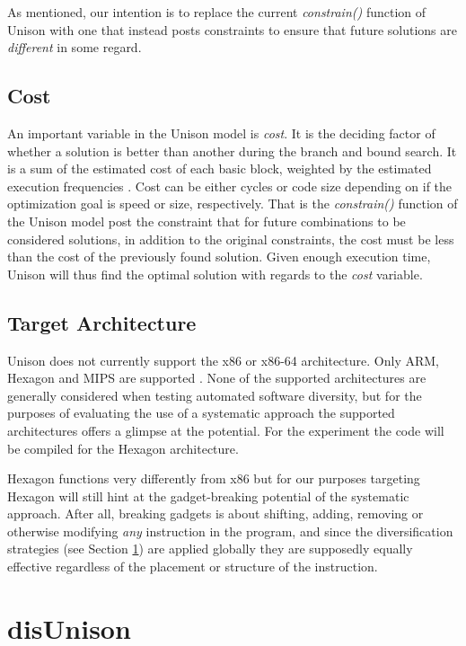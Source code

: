 As mentioned, our intention is to replace the current \textit{constrain()} function of
Unison with one that instead posts constraints to ensure that future solutions are
\textit{different} in some regard.

\subsection{Cost}
\label{sec:cost}

An important variable in the Unison model is \textit{cost}. It is the deciding factor
of whether a solution is better than another during the branch and bound search. It is a
sum of the estimated cost of each basic block, weighted by the estimated execution
frequencies \cite{unison-docs}. Cost can be either cycles or code size depending on if the
optimization goal is speed or size, respectively. That is the \textit{constrain()} function
of the Unison model post the constraint that for future combinations to be considered
solutions, in addition to the original constraints, the cost must be less than the cost of
the previously found solution. Given enough execution time, Unison will thus find the
optimal solution with regards to the \textit{cost} variable.

\subsection{Target Architecture}
\label{sec:arch}

Unison does not currently support the x86 or x86-64 architecture. Only ARM, Hexagon and MIPS
are supported \cite{unison-src}. None of the supported architectures are generally considered
when testing automated software diversity, but for the purposes of evaluating the use of
a systematic approach the supported architectures offers a glimpse at the potential. For
the experiment the code will be compiled for the Hexagon architecture.

Hexagon functions very differently from x86 but for our purposes targeting Hexagon will
still hint at the gadget-breaking potential of the systematic approach. After all,
breaking gadgets is about shifting, adding, removing or otherwise modifying \textit{any}
instruction in the program, and since the diversification strategies (see Section
\ref{sec:disUnison}) are applied globally they are supposedly equally effective regardless
of the placement or structure of the instruction.

\section{disUnison}
\label{sec:disUnison}

